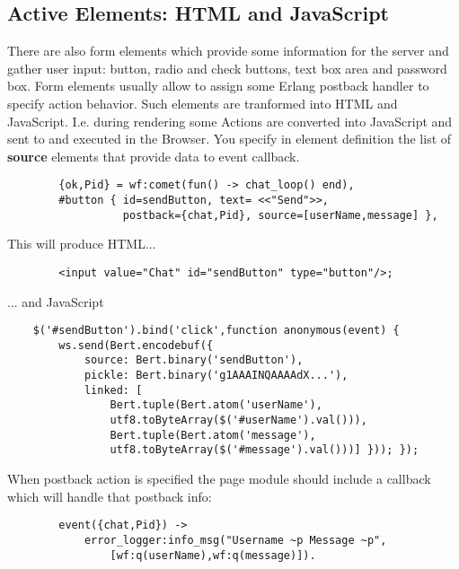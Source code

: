 \subsection{Active Elements: HTML and JavaScript}
There are also form elements which provide some information for the server
and gather user input:  button, radio and check buttons, text box area and password box.
Form elements usually allow to assign some Erlang postback handler to specify action behavior.
Such elements are tranformed into HTML and JavaScript. I.e. during rendering some
Actions are converted into JavaScript and sent to and executed in the Browser.
You specify in element definition the list of {\bf source} elements that provide data to event callback.

\vspace{1\baselineskip}
\begin{lstlisting}
        {ok,Pid} = wf:comet(fun() -> chat_loop() end),
        #button { id=sendButton, text= <<"Send">>, 
                  postback={chat,Pid}, source=[userName,message] },
\end{lstlisting}
\vspace{1\baselineskip}

This will produce HTML...

\vspace{1\baselineskip}
\begin{lstlisting}
        <input value="Chat" id="sendButton" type="button"/>;
\end{lstlisting}
\vspace{1\baselineskip}

... and JavaScript

\vspace{1\baselineskip}
\begin{lstlisting}
    $('#sendButton').bind('click',function anonymous(event) { 
        ws.send(Bert.encodebuf({
            source: Bert.binary('sendButton'), 
            pickle: Bert.binary('g1AAAINQAAAAdX...'),
            linked: [
                Bert.tuple(Bert.atom('userName'),
                utf8.toByteArray($('#userName').val())),
                Bert.tuple(Bert.atom('message'),
                utf8.toByteArray($('#message').val()))] })); });
\end{lstlisting}
\vspace{1\baselineskip}

When postback action is specified the page module should include a callback which will handle that postback info:

\vspace{1\baselineskip}
\begin{lstlisting}
        event({chat,Pid}) ->
            error_logger:info_msg("Username ~p Message ~p",
                [wf:q(userName),wf:q(message)]).
\end{lstlisting}
\vspace{1\baselineskip}


